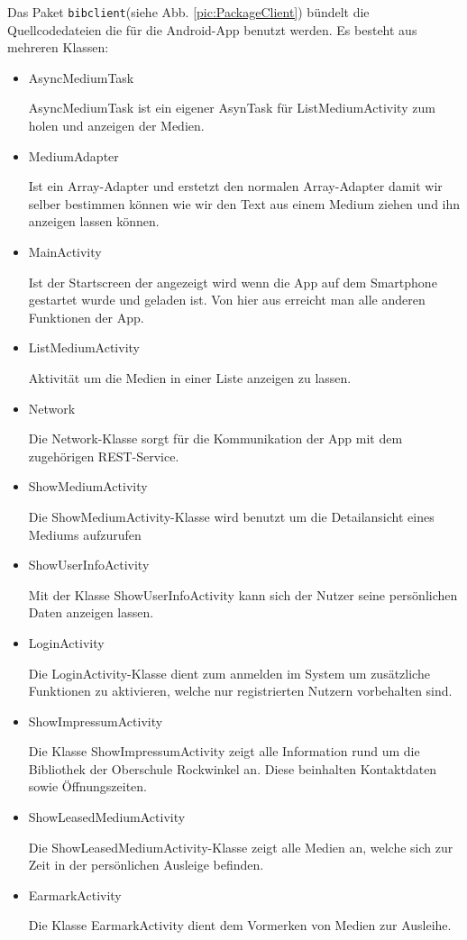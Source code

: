 \documentclass[fontsize=12pt,paper=a4,twoside]{scrartcl}
\begin{document}
Das Paket \texttt{bibclient}(siehe Abb. \vref{pic:PackageClient}) bündelt die Quellcodedateien die für die Android-App benutzt werden. Es besteht aus mehreren Klassen:
\begin{itemize}

\item{AsyncMediumTask}

AsyncMediumTask ist ein eigener AsynTask für ListMediumActivity zum holen und anzeigen der Medien.

\item{MediumAdapter}

Ist ein Array-Adapter und erstetzt den normalen Array-Adapter damit wir selber bestimmen können wie wir den Text aus einem Medium ziehen und ihn anzeigen lassen können.

\newpage
\item{MainActivity}

Ist der Startscreen der angezeigt wird wenn die App auf dem Smartphone gestartet wurde und geladen ist. Von hier aus erreicht man alle anderen Funktionen der App.

\item{ListMediumActivity}

Aktivität um die Medien in einer Liste anzeigen zu lassen.

\item{Network}

Die Network-Klasse sorgt für die Kommunikation der App mit dem zugehörigen REST-Service.

\item{ShowMediumActivity}

Die ShowMediumActivity-Klasse wird benutzt um die Detailansicht eines Mediums aufzurufen

\item{ShowUserInfoActivity}

Mit der Klasse ShowUserInfoActivity kann sich der Nutzer seine persönlichen Daten anzeigen lassen.

\item{LoginActivity}

Die LoginActivity-Klasse dient zum anmelden im System um zusätzliche Funktionen zu aktivieren, welche nur registrierten Nutzern vorbehalten sind.

\item{ShowImpressumActivity}

Die Klasse ShowImpressumActivity zeigt alle Information rund um die Bibliothek der Oberschule Rockwinkel an. Diese beinhalten Kontaktdaten sowie Öffnungszeiten.

\item{ShowLeasedMediumActivity}

Die ShowLeasedMediumActivity-Klasse zeigt alle Medien an, welche sich zur Zeit in der persönlichen Ausleige befinden.

\item{EarmarkActivity}

Die Klasse EarmarkActivity dient dem Vormerken von Medien zur Ausleihe.

\end{itemize}
\end{document}
